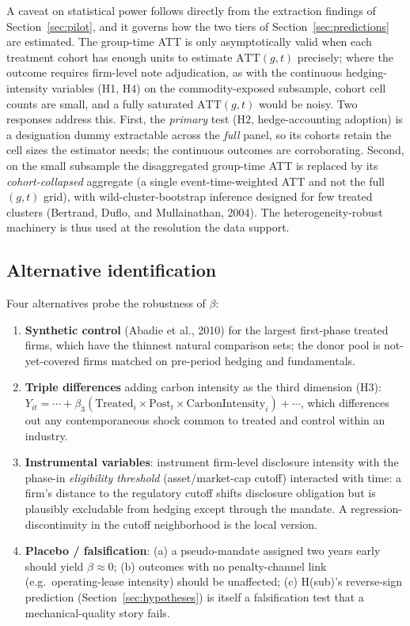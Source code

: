 \documentclass[11pt,a4paper]{article}
\begin{document}
A caveat on statistical power follows directly from the extraction findings of Section~\ref{sec:pilot}, and it governs how the two tiers of Section~\ref{sec:predictions} are estimated. The group-time ATT is only asymptotically valid when each treatment cohort has enough units to estimate $\mathrm{ATT}(g,t)$ precisely; where the outcome requires firm-level note adjudication, as with the continuous hedging-intensity variables (H1, H4) on the commodity-exposed subsample, cohort cell counts are small, and a fully saturated $\mathrm{ATT}(g,t)$ would be noisy. Two responses address this. First, the \emph{primary} test (H2, hedge-accounting adoption) is a designation dummy extractable across the \emph{full} panel, so its cohorts retain the cell sizes the estimator needs; the continuous outcomes are corroborating. Second, on the small subsample the disaggregated group-time ATT is replaced by its \emph{cohort-collapsed} aggregate (a single event-time-weighted ATT and not the full $(g,t)$ grid), with wild-cluster-bootstrap inference designed for few treated clusters (Bertrand, Duflo, and Mullainathan, 2004). The heterogeneity-robust machinery is thus used at the resolution the data support.

\subsection{Alternative identification}
\label{sec:altid}

Four alternatives probe the robustness of $\beta$:
\begin{enumerate}
\item \textbf{Synthetic control} (Abadie et al., 2010) for the largest first-phase treated firms, which have the thinnest natural comparison sets; the donor pool is not-yet-covered firms matched on pre-period hedging and fundamentals.
\item \textbf{Triple differences} adding carbon intensity as the third dimension (H3): $Y_{it}=\cdots+\beta_3(\text{Treated}_i\times\text{Post}_t\times\text{CarbonIntensity}_i)+\cdots$, which differences out any contemporaneous shock common to treated and control within an industry.
\item \textbf{Instrumental variables}: instrument firm-level disclosure intensity with the phase-in \emph{eligibility threshold} (asset/market-cap cutoff) interacted with time: a firm's distance to the regulatory cutoff shifts disclosure obligation but is plausibly excludable from hedging except through the mandate. A regression-discontinuity in the cutoff neighborhood is the local version.
\item \textbf{Placebo / falsification}: (a) a pseudo-mandate assigned two years early should yield $\beta\approx0$; (b) outcomes with no penalty-channel link (e.g.\ operating-lease intensity) should be unaffected; (c) H(sub)'s reverse-sign prediction (Section~\ref{sec:hypotheses}) is itself a falsification test that a mechanical-quality story fails.
\end{enumerate}
\end{document}
